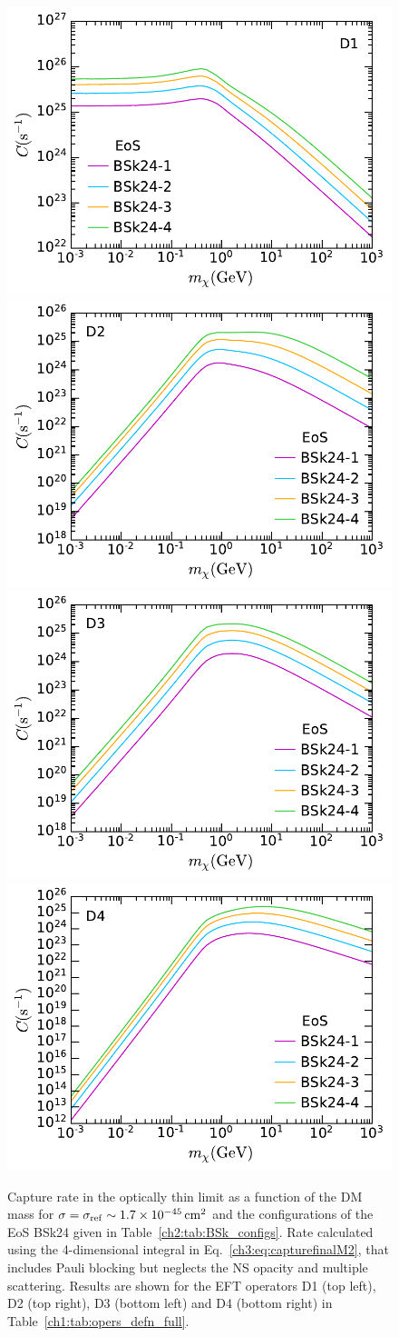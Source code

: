 \begin{figure}[t!bp]
    \centering
    \includegraphics[width=.45\textwidth]{capture_1/capture_rate_numeric_EOS_D1.pdf}
    \includegraphics[width=.45\textwidth]{capture_1/capture_rate_numeric_EOS_D2.pdf}\\
    \includegraphics[width=.45\textwidth]{capture_1/capture_rate_numeric_EOS_D3.pdf}
    \includegraphics[width=.45\textwidth]{capture_1/capture_rate_numeric_EOS_D4.pdf}
    \caption{Capture rate in the optically thin limit as a function of the DM mass for $\sigma=\sigma_\mathrm{ref}\sim 1.7 \times 10^{-45} {\rm \,cm}^2$ and the configurations of the EoS BSk24 given in Table~\ref{ch2:tab:BSk_configs}. Rate calculated using the 4-dimensional integral in Eq.~\ref{ch3:eq:capturefinalM2}, that includes Pauli blocking but neglects the NS opacity and multiple scattering. Results are shown for the EFT operators D1 (top left), D2 (top right), D3 (bottom left) and D4 (bottom right) in Table~\ref{ch1:tab:opers_defn_full}.}
    \label{ch3:fig:captureEOS}
\end{figure}




